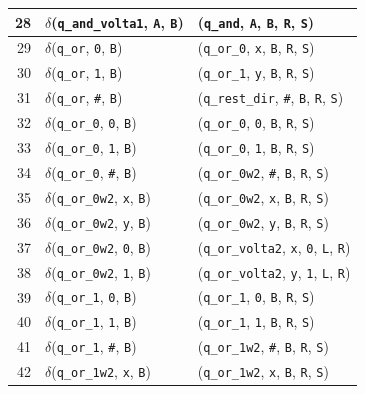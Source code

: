 \documentclass[report, 12pt]{uftreport}
\begin{document}
{\begin{longtable}{r l l}
28 & $\delta$(\texttt{q\_and\_volta1}, \texttt{A}, \texttt{B}) & (\texttt{q\_and}, \texttt{A}, \texttt{B}, \texttt{R}, \texttt{S}) \\
\midrule
29 & $\delta$(\texttt{q\_or}, \texttt{0}, \texttt{B}) & (\texttt{q\_or\_0}, \texttt{x}, \texttt{B}, \texttt{R}, \texttt{S}) \\
30 & $\delta$(\texttt{q\_or}, \texttt{1}, \texttt{B}) & (\texttt{q\_or\_1}, \texttt{y}, \texttt{B}, \texttt{R}, \texttt{S}) \\
31 & $\delta$(\texttt{q\_or}, \texttt{\#}, \texttt{B}) & (\texttt{q\_rest\_dir}, \texttt{\#}, \texttt{B}, \texttt{R}, \texttt{S}) \\
\midrule
32 & $\delta$(\texttt{q\_or\_0}, \texttt{0}, \texttt{B}) & (\texttt{q\_or\_0}, \texttt{0}, \texttt{B}, \texttt{R}, \texttt{S}) \\
33 & $\delta$(\texttt{q\_or\_0}, \texttt{1}, \texttt{B}) & (\texttt{q\_or\_0}, \texttt{1}, \texttt{B}, \texttt{R}, \texttt{S}) \\
34 & $\delta$(\texttt{q\_or\_0}, \texttt{\#}, \texttt{B}) & (\texttt{q\_or\_0w2}, \texttt{\#}, \texttt{B}, \texttt{R}, \texttt{S}) \\
\midrule
35 & $\delta$(\texttt{q\_or\_0w2}, \texttt{x}, \texttt{B}) & (\texttt{q\_or\_0w2}, \texttt{x}, \texttt{B}, \texttt{R}, \texttt{S}) \\
36 & $\delta$(\texttt{q\_or\_0w2}, \texttt{y}, \texttt{B}) & (\texttt{q\_or\_0w2}, \texttt{y}, \texttt{B}, \texttt{R}, \texttt{S}) \\
37 & $\delta$(\texttt{q\_or\_0w2}, \texttt{0}, \texttt{B}) & (\texttt{q\_or\_volta2}, \texttt{x}, \texttt{0}, \texttt{L}, \texttt{R}) \\
38 & $\delta$(\texttt{q\_or\_0w2}, \texttt{1}, \texttt{B}) & (\texttt{q\_or\_volta2}, \texttt{y}, \texttt{1}, \texttt{L}, \texttt{R}) \\
\midrule
39 & $\delta$(\texttt{q\_or\_1}, \texttt{0}, \texttt{B}) & (\texttt{q\_or\_1}, \texttt{0}, \texttt{B}, \texttt{R}, \texttt{S}) \\
40 & $\delta$(\texttt{q\_or\_1}, \texttt{1}, \texttt{B}) & (\texttt{q\_or\_1}, \texttt{1}, \texttt{B}, \texttt{R}, \texttt{S}) \\
41 & $\delta$(\texttt{q\_or\_1}, \texttt{\#}, \texttt{B}) & (\texttt{q\_or\_1w2}, \texttt{\#}, \texttt{B}, \texttt{R}, \texttt{S}) \\
\midrule
42 & $\delta$(\texttt{q\_or\_1w2}, \texttt{x}, \texttt{B}) & (\texttt{q\_or\_1w2}, \texttt{x}, \texttt{B}, \texttt{R}, \texttt{S}) \\

\end{longtable}}
\end{document}
